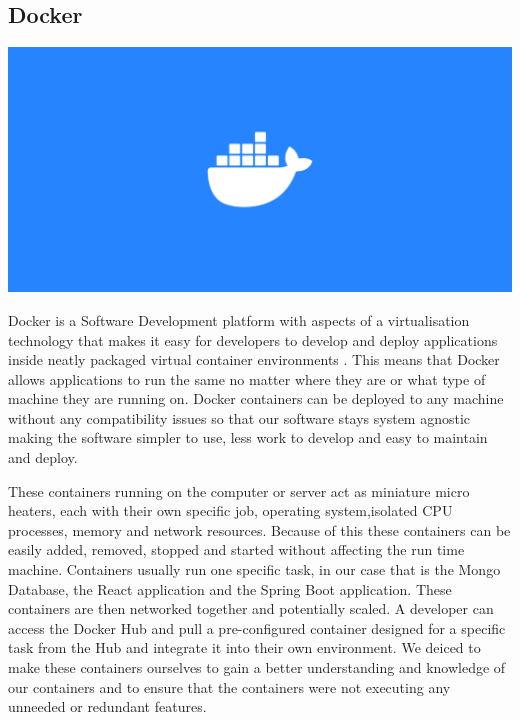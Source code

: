 \subsection{Docker}
\includegraphics[scale=0.2]{img/docker-logo.png} \par
Docker is a Software Development platform with aspects of a virtualisation technology that makes it easy for developers to develop and deploy applications inside neatly packaged virtual container environments \cite{Docker}. This means that Docker allows applications to run the same no matter where they are or what type of machine they are running on. Docker containers can be deployed to any machine without any compatibility issues so that our software stays system agnostic making the software simpler to use, less work to develop and easy to maintain and deploy. \par
These containers running on the computer or server act as miniature micro heaters, each with their own specific job, operating system,isolated CPU processes, memory and network resources. Because of this these containers can be easily added, removed, stopped and started without affecting the run time machine. Containers usually run one specific task, in our case that is the Mongo Database, the React application and the Spring Boot application. These containers are then networked together and potentially scaled. A developer can access the Docker Hub and pull a pre-configured container designed for a specific task from the Hub and integrate it into their own environment. We deiced to make these containers ourselves to gain a better understanding and knowledge of our containers and to ensure that the containers were not executing any unneeded or redundant features.

